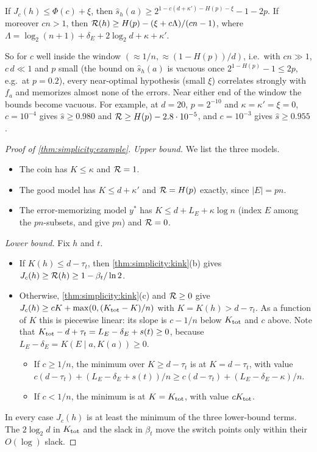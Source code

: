\begin{corollary}\label{cor:simplicity:example}
If $J_c(h)\le\Phi(c)+\xi$, then $\hat s_h(a)\ge2^{1-c(d+\kappa')-H(p)-\xi}-1-2p$. If moreover $cn>1$, then $\mathcal R(h)\ge H(p)-(\xi+c\Lambda)/(cn-1)$, where $\Lambda=\log_2(n+1)+\delta_E+2\log_2d+\kappa+\kappa'$.
\end{corollary}

So for $c$ well inside the window $(\approx1/n,\approx(1-H(p))/d)$, i.e.\ with $cn\gg1$, $c\,d\ll1$ and $p$ small (the bound on $\hat s_h(a)$ is vacuous once $2^{1-H(p)}-1\le2p$, e.g.\ at $p=0.2$), every near-optimal hypothesis (small $\xi$) correlates strongly with $f_a$ and memorizes almost none of the errors. Near either end of the window the bounds become vacuous. For example, at $d=20$, $p=2^{-10}$ and $\kappa=\kappa'=\xi=0$, $c=10^{-4}$ gives $\hat s\ge0.980$ and $\mathcal R\ge H(p)-2.8\cdot10^{-5}$, and $c=10^{-3}$ gives $\hat s\ge0.955$ .

\begin{proof}[Proof of \cref{thm:simplicity:example}]
\emph{Upper bound.} We list the three models.
\begin{itemize}
\item The coin has $K\le\kappa$ and $\mathcal R=1$.
\item The good model has $K\le d+\kappa'$ and $\mathcal R=H(p)$ exactly, since $|E|=pn$.
\item The error-memorizing model $y^*$ has $K\le d+L_E+\kappa\log n$ (index $E$ among the $pn$-subsets, and give $pn$) and $\mathcal R=0$.
\end{itemize}

\emph{Lower bound.} Fix $h$ and $t$.
\begin{itemize}
\item If $K(h)\le d-\tau_t$, then \cref{thm:simplicity:kink}(b) gives $J_c(h)\ge\mathcal R(h)\ge1-\beta_t/\ln2$.
\item Otherwise, \cref{thm:simplicity:kink}(c) and $\mathcal R\ge0$ give $J_c(h)\ge cK+\max(0,(K_{\rm tot}-K)/n)$ with $K=K(h)>d-\tau_t$. As a function of $K$ this is piecewise linear: its slope is $c-1/n$ below $K_{\rm tot}$ and $c$ above. Note that $K_{\rm tot}-d+\tau_t=L_E-\delta_E+s(t)\ge0$, because $L_E-\delta_E=K(E\mid a,K(a))\ge0$.
  \begin{itemize}
  \item If $c\ge1/n$, the minimum over $K\ge d-\tau_t$ is at $K=d-\tau_t$, with value $c(d-\tau_t)+(L_E-\delta_E+s(t))/n\ge c(d-\tau_t)+(L_E-\delta_E-\kappa)/n$.
  \item If $c<1/n$, the minimum is at $K=K_{\rm tot}$, with value $cK_{\rm tot}$.
  \end{itemize}
\end{itemize}
In every case $J_c(h)$ is at least the minimum of the three lower-bound terms. The $2\log_2d$ in $K_{\rm tot}$ and the slack in $\beta_t$ move the switch points only within their $O(\log)$ slack.
\end{proof}

